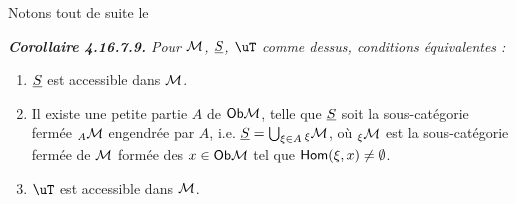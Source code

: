 \noindent Notons tout de suite le

\begingroup\itshape
\noindent\textbf{\upshape Corollaire 4.16.7.9.} Pour $\mathcal{M}$, $\underline{S}$, $\uT$ comme dessus, conditions équivalentes :
\begin{enumerate}[label={}]
\item[a)] $\underline{S}$ est accessible dans $\mathcal{M}$.
\item[a$'$)] Il existe une \textup{petite} partie $A$ de $\mathsf{Ob} \mathcal{M}$, telle que $\underline{S}$ soit la sous-catégorie fermée ${}_A\mathcal{M}$ engendrée par $A$, i.e. $\underline{S} = \bigcup_{\xi\in A} {}_\xi\mathcal{M}$, où ${}_\xi\mathcal{M}$ est la sous-catégorie fermée de $\mathcal{M}$ formée des $x \in \mathsf{Ob} \mathcal{M}$ tel que $\mathsf{Hom}(\xi, x) \neq \emptyset$.
\item[b)] $\uT$ est accessible dans $\mathcal{M}$.
\end{enumerate}
\endgroup

